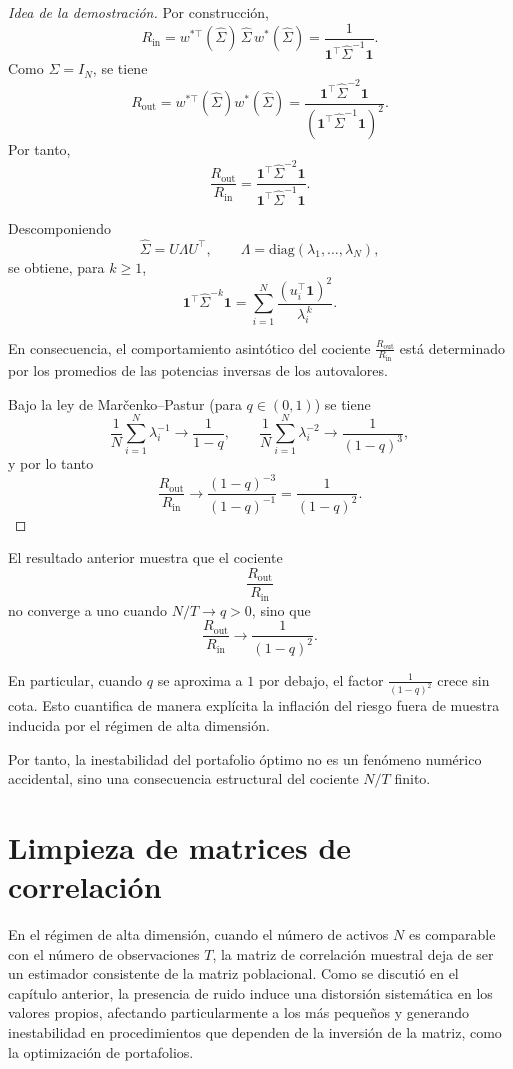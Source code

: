 \documentclass[letterpaper,12pt,oneside]{book}
\begin{document}
\begin{proof}[Idea de la demostración]
Por construcción,
\[
R_{\text{in}}
=
w^{*\top}(\widehat{\Sigma})\,\widehat{\Sigma}\,w^*(\widehat{\Sigma})
=
\frac{1}{\mathbf{1}^\top \widehat{\Sigma}^{-1}\mathbf{1}}.
\]
Como $\Sigma=I_N$, se tiene
\[
R_{\text{out}}
=
w^{*\top}(\widehat{\Sigma})w^*(\widehat{\Sigma})
=
\frac{\mathbf{1}^\top \widehat{\Sigma}^{-2}\mathbf{1}}
{\left(\mathbf{1}^\top \widehat{\Sigma}^{-1}\mathbf{1}\right)^2}.
\]
Por tanto,
\[
\frac{R_{\text{out}}}{R_{\text{in}}}
=
\frac{\mathbf{1}^\top \widehat{\Sigma}^{-2}\mathbf{1}}
{\mathbf{1}^\top \widehat{\Sigma}^{-1}\mathbf{1}}.
\]

Descomponiendo
\[
\widehat{\Sigma}
=
U \Lambda U^\top,
\qquad
\Lambda=\mathrm{diag}(\lambda_1,\dots,\lambda_N),
\]
se obtiene, para $k\ge 1$,
\[
\mathbf{1}^\top \widehat{\Sigma}^{-k}\mathbf{1}
=
\sum_{i=1}^N
\frac{(u_i^\top \mathbf{1})^2}{\lambda_i^{\,k}}.
\]

En consecuencia, el comportamiento asintótico del cociente $\frac{R_{\text{out}}}{R_{\text{in}}}$
está determinado por los promedios de las potencias inversas de los autovalores.

Bajo la ley de Mar\v{c}enko--Pastur (para $q\in(0,1)$) se tiene
\[
\frac{1}{N}\sum_{i=1}^N \lambda_i^{-1}
\longrightarrow \frac{1}{1-q},
\qquad
\frac{1}{N}\sum_{i=1}^N \lambda_i^{-2}
\longrightarrow \frac{1}{(1-q)^3},
\]
y por lo tanto
\[
\frac{R_{\text{out}}}{R_{\text{in}}}
\longrightarrow
\frac{(1-q)^{-3}}{(1-q)^{-1}}
=
\frac{1}{(1-q)^2}.
\]
\end{proof}

El resultado anterior muestra que el cociente
\[
\frac{R_{\text{out}}}{R_{\text{in}}}
\]
no converge a uno cuando $N/T \to q>0$, sino que
\[
\frac{R_{\text{out}}}{R_{\text{in}}}
\longrightarrow
\frac{1}{(1-q)^2}.
\]

En particular, cuando $q$ se aproxima a $1$ por debajo, el factor $\frac{1}{(1-q)^2}$ crece sin cota.
Esto cuantifica de manera explícita la inflación del riesgo fuera de muestra inducida por el régimen de alta dimensión.

Por tanto, la inestabilidad del portafolio óptimo no es un fenómeno numérico accidental, sino una consecuencia estructural del cociente $N/T$ finito.

\chapter{Limpieza de matrices de correlación}

En el régimen de alta dimensión, cuando el número de activos $N$ es comparable con el número de observaciones $T$, la matriz de correlación muestral deja de ser un estimador consistente de la matriz poblacional. Como se discutió en el capítulo anterior, la presencia de ruido induce una distorsión sistemática en los valores propios, afectando particularmente a los más pequeños y generando inestabilidad en procedimientos que dependen de la inversión de la matriz, como la optimización de portafolios.
\end{document}
